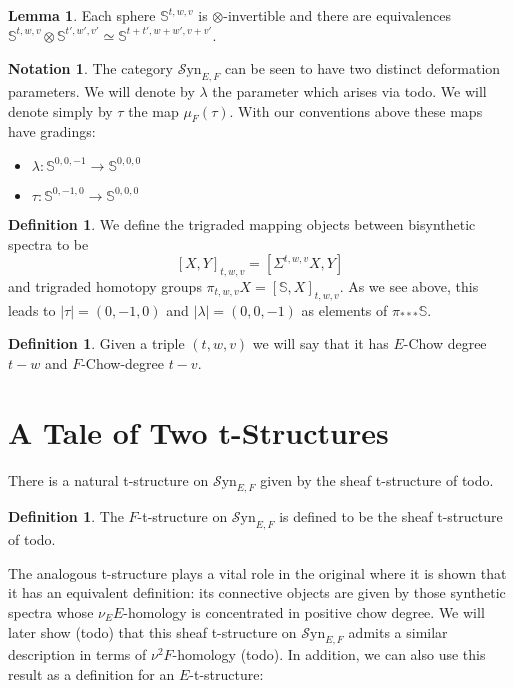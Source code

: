 \documentclass[10pt]{amsart}
\theoremstyle{definition}
\numberwithin{figure}{section}
\numberwithin{equation}{section}
\newtheorem{lemma}[figure]{Lemma}
\newtheorem{definition}[figure]{Definition}
\newtheorem{notation}[figure]{Notation}
\theoremstyle{cited}
\newcommand{\bS}{\mathbb{S}}
\newcommand{\Syn}{\mathcal{S}\mathrm{yn}}
\begin{document}
\begin{lemma}
  Each sphere $\bS^{t,w,v}$ is $\otimes$-invertible and there are equivalences $\bS^{t,w,v}\otimes \bS^{t',w',v'}\simeq \bS^{t+t',w+w',v+v'}$.
\end{lemma}

\begin{notation}
  The category $\Syn_{E,F}$ can be seen to have two distinct deformation parameters. We will denote by $\lambda$ the parameter which arises via todo. We will denote simply by $\tau$ the map $\mu_F(\tau)$. With our conventions above these maps have gradings:
  \begin{itemize}
    \item $\lambda:\bS^{0,0,-1}\to \bS^{0,0,0}$
    \item $\tau:\bS^{0,-1,0}\to \bS^{0,0,0}$
  \end{itemize}
\end{notation}



\begin{definition}
  We define the trigraded mapping objects between bisynthetic spectra to be
  \[
  [X,Y]_{t,w,v}=[\Sigma^{t,w,v}X, Y]
  \]
  and trigraded homotopy groups $\pi_{t,w,v}X=[\bS, X]_{t,w,v}$. As we see above, this leads to $|\tau|=(0,-1,0)$ and $|\lambda|=(0,0,-1)$ as elements of $\pi_{***}\bS$.
\end{definition}

\begin{definition}
  Given a triple $(t,w,v)$ we will say that it has $E$-Chow degree $t-w$ and $F$-Chow-degree $t-v$.
\end{definition}

\section{A Tale of Two t-Structures}

There is a natural t-structure on $\Syn_{E,F}$ given by the sheaf t-structure of todo. 

\begin{definition}
  The $F$-t-structure on $\Syn_{E,F}$ is defined to be the sheaf t-structure of todo.
\end{definition}

The analogous t-structure plays a vital role in the original \cite{Pst22} where it is shown that it has an equivalent definition: its connective objects are given by those synthetic spectra whose $\nu_EE$-homology is concentrated in positive chow degree. We will later show (todo) that this sheaf t-structure on $\Syn_{E,F}$ admits a similar description in terms of $\nu^2F$-homology (todo). In addition, we can also use this result as a definition for an $E$-t-structure:
\end{document}
